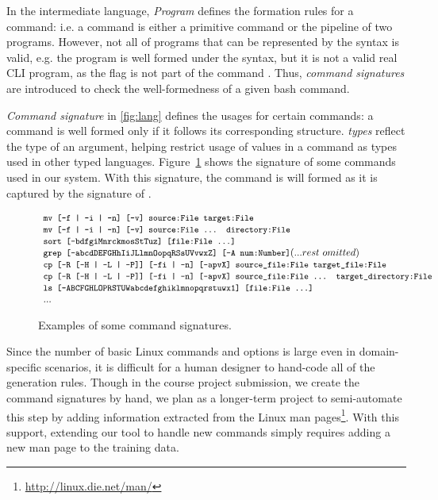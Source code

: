In the intermediate language, \textit{Program} defines the formation rules for a command: i.e. a command is either a primitive command or the pipeline of two programs. However, not all of programs that can be represented by the syntax is valid, e.g. the program  is well formed under the syntax, but it is not a valid real CLI program, as the  flag is not part of the command . Thus, \textit{command signatures} are introduced to check the well-formedness of a given bash command.

\textit{Command signature} in \autoref{fig:lang} defines the usages for certain commands: a command is well formed only if it follows its corresponding structure. \textit{types} reflect the type of an argument, helping restrict usage of values in a command as types used in other typed languages. Figure~\ref{fig:cmdsig} shows the signature of some commands used in our system. With this signature, the command  is will formed as it is captured by the signature of .

\begin{figure}[ht]
\[
\begin{array}{l}

\code{mv [-f | -i | -n] [-v] source:File target:File}\\
\code{mv [-f | -i | -n] [-v] source:File ... directory:File}\\
\code{sort [-bdfgiMnrckmosStTuz] [file:File ...]}\\
\code{grep [-abcdDEFGHhIiJLlmnOopqRSsUVvwxZ] [-A num:Number]} (... rest~omitted)\\
\code{cp [-R [-H | -L | -P]] [-fi | -n] [-apvX] source\_file:File target\_file:File}\\
\code{cp [-R [-H | -L | -P]] [-fi | -n] [-apvX] source\_file:File ... target\_directory:File}\\
\code{ls [-ABCFGHLOPRSTUW\@abcdefghiklmnopqrstuwx1] [file:File ...]}\\
...
\end{array}
\]
\vspace{-15pt}
\caption{Examples of some command signatures.}
\label{fig:cmdsig}
\end{figure}

Since the number of basic Linux commands and options is large even in domain-specific scenarios, it is difficult for a human designer to hand-code all of the generation rules. Though in the course project submission, we create the command signatures by hand, we plan as a longer-term project to semi-automate this step by adding information extracted from the Linux man pages\footnote{\url{http://linux.die.net/man/}}. With this support, extending our tool to handle new commands simply requires adding a new man page to the training data.